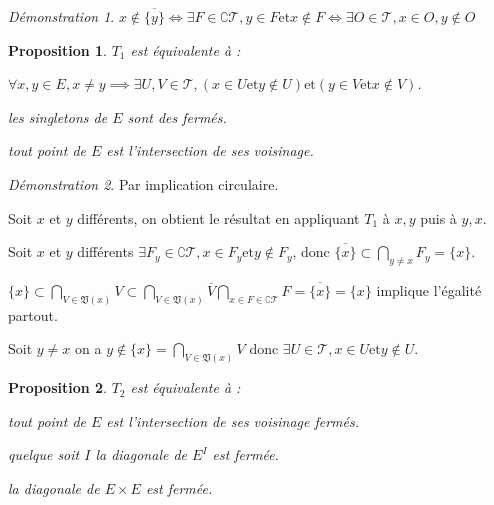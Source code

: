 \documentclass[a4paper, 11pt, french]{book}
\newenvironment{itemise}{\itemize}{\enditemize}
\theoremstyle{plain} %
\newtheorem{proposition}{Proposition}
\theoremstyle{definition} %
\theoremstyle{remark} %
\newtheorem*{demonstration}{Démonstration}
\newcommand{\1}{\mathds{1}}
\newcommand{\et}{\mathrel{\mathrm{et}}}
\renewcommand{\frak}[1]{\mathfrak{#1}}
\newcommand{\scr}[1]{\mathscr{#1}}
\begin{document}
\begin{demonstration}
	$x\notin\overline{\{y\}}
		\iff\exists F\in\complement\scr{T}, y\in F\et x\notin F
		\iff\exists O\in\scr{T}, x\in O, y\notin O$
\end{demonstration}

\begin{proposition}
	$T_1$ est équivalente à :
	\begin{itemise}
		\item $\forall x, y\in E, x\neq y\implies\exists U, V\in\scr{T}, (x\in U\et y\notin U)\et(y\in V\et x\notin V)$.
		\item les singletons de $E$ sont des fermés.
		\item tout point de $E$ est l'intersection de ses voisinage.
	\end{itemise}
\end{proposition}

\begin{demonstration}
	Par implication circulaire.
	\begin{itemise}
		\item Soit $x$ et $y$ différents, on obtient le résultat en appliquant $T_1$ à $x, y$ puis à $y, x$.
		\item Soit $x$ et $y$ différents $\exists F_y\in\complement\scr{T}, x\in F_y\et y\notin F_y$, donc $\overline{\{x\}}\subset\bigcap_{y\neq x}F_y=\{x\}$.
		\item $\{x\}\subset\bigcap_{V\in\frak{V}(x)}V\subset\bigcap_{V\in\frak{V}(x)}\overline{V}\bigcap_{x\in F\in\complement\scr{T}}F=\overline{\{x\}}=\{x\}$ implique l'égalité partout.
		\item Soit $y\neq x$ on a $y\notin\{x\}=\bigcap_{V\in\frak{V}(x)}V$ donc $\exists U\in\scr{T}, x\in U\et y\notin U$.
	\end{itemise}
\end{demonstration}

\begin{proposition}
	$T_2$ est équivalente à :
	\begin{itemise}
		\item tout point de $E$ est l'intersection de ses voisinage fermés.
		\item quelque soit $I$ la diagonale de $E^I$ est fermée.
		\item la diagonale de $E\times E$ est fermée.
	\end{itemise}
\end{proposition}
\end{document}
